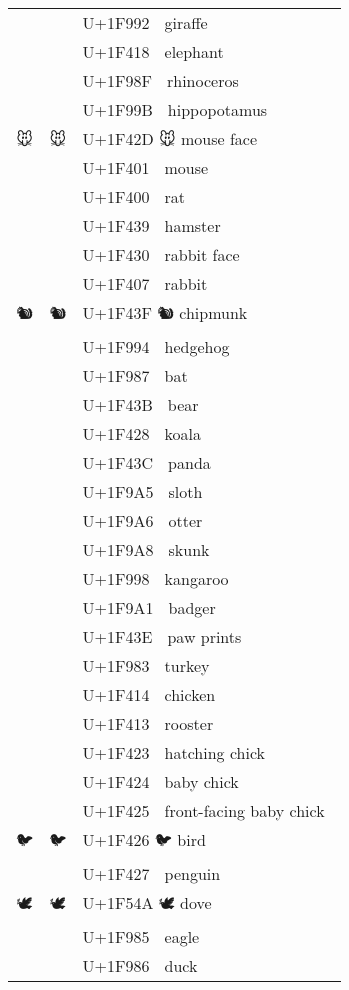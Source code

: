 \documentclass[a4paper,12pt]{article}
\newcommand{\fontA}[1]{{\fontspec[RawFeature={mode=harf,+dist,+ccmp}]{Segoe UI Emoji} #1}}
\newcommand{\fontB}[1]{{\fontspec[RawFeature={mode=harf,+dist,+ccmp}]{Noto Color Emoji} #1}}
\begin{document}
\begin{longtable}[c]{ccp{0.8\linewidth}}
\fontA{🦒}&\fontB{🦒}&U+1F992 🦒 giraffe\\
\fontA{🐘}&\fontB{🐘}&U+1F418 🐘 elephant\\
\fontA{🦏}&\fontB{🦏}&U+1F98F 🦏 rhinoceros\\
\fontA{🦛}&\fontB{🦛}&U+1F99B 🦛 hippopotamus\\
\fontA{🐭}&\fontB{🐭}&U+1F42D 🐭 mouse face\\
\fontA{🐁}&\fontB{🐁}&U+1F401 🐁 mouse\\
\fontA{🐀}&\fontB{🐀}&U+1F400 🐀 rat\\
\fontA{🐹}&\fontB{🐹}&U+1F439 🐹 hamster\\
\fontA{🐰}&\fontB{🐰}&U+1F430 🐰 rabbit face\\
\fontA{🐇}&\fontB{🐇}&U+1F407 🐇 rabbit\\
\fontA{🐿}&\fontB{🐿}&U+1F43F 🐿 chipmunk\\
\fontA{🦔}&\fontB{🦔}&U+1F994 🦔 hedgehog\\
\fontA{🦇}&\fontB{🦇}&U+1F987 🦇 bat\\
\fontA{🐻}&\fontB{🐻}&U+1F43B 🐻 bear\\
\fontA{🐨}&\fontB{🐨}&U+1F428 🐨 koala\\
\fontA{🐼}&\fontB{🐼}&U+1F43C 🐼 panda\\
\fontA{🦥}&\fontB{🦥}&U+1F9A5 🦥 sloth\\
\fontA{🦦}&\fontB{🦦}&U+1F9A6 🦦 otter\\
\fontA{🦨}&\fontB{🦨}&U+1F9A8 🦨 skunk\\
\fontA{🦘}&\fontB{🦘}&U+1F998 🦘 kangaroo\\
\fontA{🦡}&\fontB{🦡}&U+1F9A1 🦡 badger\\
\fontA{🐾}&\fontB{🐾}&U+1F43E 🐾 paw prints\\
\fontA{🦃}&\fontB{🦃}&U+1F983 🦃 turkey\\
\fontA{🐔}&\fontB{🐔}&U+1F414 🐔 chicken\\
\fontA{🐓}&\fontB{🐓}&U+1F413 🐓 rooster\\
\fontA{🐣}&\fontB{🐣}&U+1F423 🐣 hatching chick\\
\fontA{🐤}&\fontB{🐤}&U+1F424 🐤 baby chick\\
\fontA{🐥}&\fontB{🐥}&U+1F425 🐥 front-facing baby chick\\
\fontA{🐦}&\fontB{🐦}&U+1F426 🐦 bird\\
\fontA{🐧}&\fontB{🐧}&U+1F427 🐧 penguin\\
\fontA{🕊}&\fontB{🕊}&U+1F54A 🕊 dove\\
\fontA{🦅}&\fontB{🦅}&U+1F985 🦅 eagle\\
\fontA{🦆}&\fontB{🦆}&U+1F986 🦆 duck\\

\end{longtable}
\end{document}
